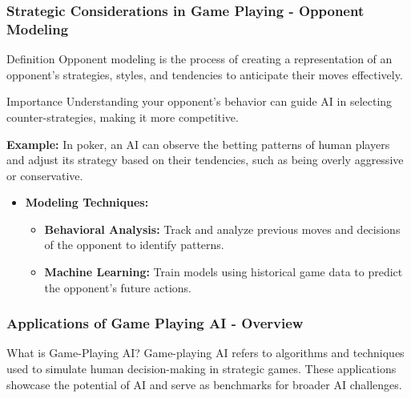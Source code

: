 \documentclass[aspectratio=169]{beamer}
\begin{document}
\begin{frame}[fragile]
    \frametitle{Strategic Considerations in Game Playing - Opponent Modeling}
    \begin{block}{Definition}
        Opponent modeling is the process of creating a representation of an opponent’s strategies, styles, and tendencies to anticipate their moves effectively.
    \end{block}
    \begin{block}{Importance}
        Understanding your opponent’s behavior can guide AI in selecting counter-strategies, making it more competitive.
    \end{block}
    
    \textbf{Example:} In poker, an AI can observe the betting patterns of human players and adjust its strategy based on their tendencies, such as being overly aggressive or conservative.

    \begin{itemize}
        \item \textbf{Modeling Techniques:}
            \begin{itemize}
                \item \textbf{Behavioral Analysis:} Track and analyze previous moves and decisions of the opponent to identify patterns.
                \item \textbf{Machine Learning:} Train models using historical game data to predict the opponent's future actions.
            \end{itemize}
    \end{itemize}
\end{frame}

\begin{frame}[fragile]
    \frametitle{Applications of Game Playing AI - Overview}
    \begin{block}{What is Game-Playing AI?}
        Game-playing AI refers to algorithms and techniques used to simulate human decision-making in strategic games. These applications showcase the potential of AI and serve as benchmarks for broader AI challenges.
    \end{block}
\end{frame}
\end{document}
